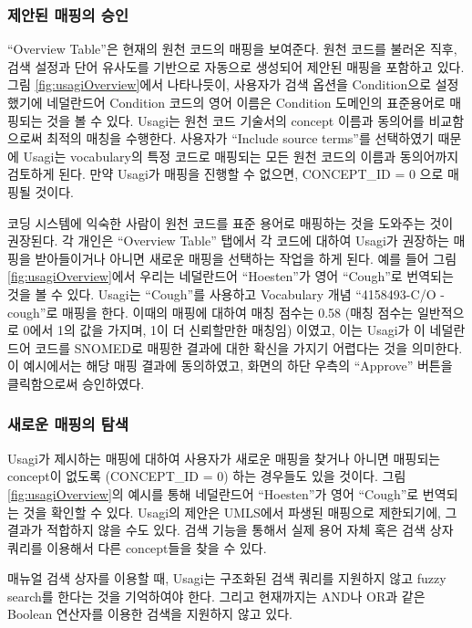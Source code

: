 \documentclass[11pt]{book}
\theoremstyle{definition}
\theoremstyle{definition}
\theoremstyle{definition}
\theoremstyle{remark}
\begin{document}
\subsubsection*{제안된 매핑의 승인}\label{--}

``Overview Table''은 현재의 원천 코드의 매핑을 보여준다. 원천 코드를
불러온 직후, 검색 설정과 단어 유사도를 기반으로 자동으로 생성되어 제안된
매핑을 포함하고 있다. 그림 \ref{fig:usagiOverview}에서 나타나듯이,
사용자가 검색 옵션을 Condition으로 설정했기에 네덜란드어 Condition
코드의 영어 이름은 Condition 도메인의 표준용어로 매핑되는 것을 볼 수
있다. Usagi는 원천 코드 기술서의 concept 이름과 동의어를 비교함으로써
최적의 매칭을 수행한다. 사용자가 ``Include source terms''를 선택하였기
때문에 Usagi는 vocabulary의 특정 코드로 매핑되는 모든 원천 코드의 이름과
동의어까지 검토하게 된다. 만약 Usagi가 매핑을 진행할 수 없으면,
CONCEPT\_ID = 0 으로 매핑될 것이다.

코딩 시스템에 익숙한 사람이 원천 코드를 표준 용어로 매핑하는 것을
도와주는 것이 권장된다. 각 개인은 ``Overview Table'' 탭에서 각 코드에
대하여 Usagi가 권장하는 매핑을 받아들이거나 아니면 새로운 매핑을
선택하는 작업을 하게 된다. 예를 들어 그림 \ref{fig:usagiOverview}에서
우리는 네덜란드어 ``Hoesten''가 영어 ``Cough''로 번역되는 것을 볼 수
있다. Usagi는 ``Cough''를 사용하고 Vocabulary 개념 ``4158493-C/O -
cough''로 매핑을 한다. 이때의 매핑에 대하여 매칭 점수는 0.58 (매칭
점수는 일반적으로 0에서 1의 값을 가지며, 1이 더 신뢰할만한 매칭임)
이였고, 이는 Usagi가 이 네덜란드어 코드를 SNOMED로 매핑한 결과에 대한
확신을 가지기 어렵다는 것을 의미한다. 이 예시에서는 해당 매핑 결과에
동의하였고, 화면의 하단 우측의 ``Approve'' 버튼을 클릭함으로써
승인하였다.

\subsubsection*{새로운 매핑의 탐색}\label{--}

Usagi가 제시하는 매핑에 대하여 사용자가 새로운 매핑을 찾거나 아니면
매핑되는 concept이 없도록 (CONCEPT\_ID = 0) 하는 경우들도 있을 것이다.
그림 \ref{fig:usagiOverview}의 예시를 통해 네덜란드어 ``Hoesten''가 영어
``Cough''로 번역되는 것을 확인할 수 있다. Usagi의 제안은 UMLS에서 파생된
매핑으로 제한되기에, 그 결과가 적합하지 않을 수도 있다. 검색 기능을
통해서 실제 용어 자체 혹은 검색 상자 쿼리를 이용해서 다른 concept들을
찾을 수 있다.

매뉴얼 검색 상자를 이용할 때, Usagi는 구조화된 검색 쿼리를 지원하지 않고
fuzzy search를 한다는 것을 기억하여야 한다. 그리고 현재까지는 AND나 OR과
같은 Boolean 연산자를 이용한 검색을 지원하지 않고 있다.
\end{document}
